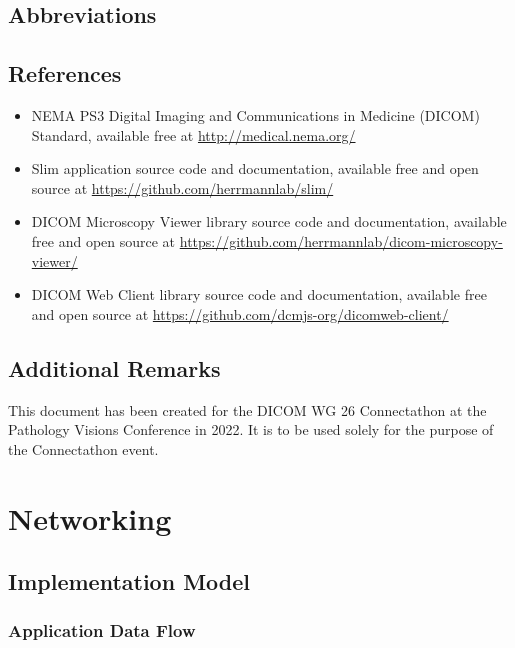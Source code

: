 \documentclass[12pt, letterpaper]{article}
\begin{document}
\subsection{Abbreviations}

\printglossary%

\subsection{References}

\begin{itemize}
    \item NEMA PS3 Digital Imaging and Communications in Medicine (DICOM) Standard, available free at \url{http://medical.nema.org/}

    \item Slim application source code and documentation, available free and open source at \url{https://github.com/herrmannlab/slim/}

    \item DICOM Microscopy Viewer library source code and documentation, available free and open source at \url{https://github.com/herrmannlab/dicom-microscopy-viewer/}

    \item DICOM Web Client library source code and documentation, available free and open source at \url{https://github.com/dcmjs-org/dicomweb-client/}
\end{itemize}

\subsection{Additional Remarks}

This document has been created for the DICOM WG 26 Connectathon at the Pathology Visions Conference in 2022.
It is to be used solely for the purpose of the Connectathon event.

\section{Networking}

\subsection{Implementation Model}

\subsubsection{Application Data Flow}
\end{document}
